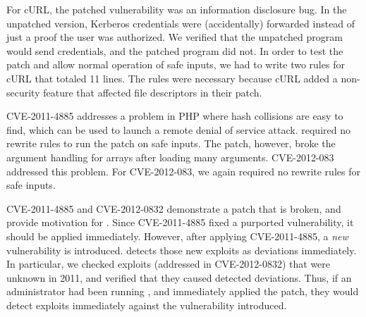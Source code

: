 
For cURL, the patched vulnerability was an information disclosure
bug. In the unpatched version, Kerberos credentials were (accidentally)
forwarded instead of just a proof the user was authorized.  We
verified that the unpatched program would send credentials, and the
patched program did not.  In order to test the patch and allow normal
operation of safe inputs, we had to write two rules for cURL that
totaled 11 lines.  The rules were necessary
because cURL added a non-security feature that affected file
descriptors in their patch.



CVE-2011-4885 addresses a problem in PHP where hash collisions are
easy to find, which can be used to launch a remote denial of service
attack. \tachyon required no rewrite rules
to run the patch on safe inputs.  The patch, however, broke the
argument handling for arrays after loading many
arguments. CVE-2012-083 addressed this problem.  For CVE-2012-083, we
again required no rewrite rules for safe inputs.

CVE-2011-4885 and CVE-2012-0832 demonstrate a patch that is broken,
and provide motivation for \tachyon. Since CVE-2011-4885 fixed a
purported vulnerability, it should be applied immediately. However,
after applying CVE-2011-4885, a \emph{new} vulnerability is
introduced. \tachyon detects those new exploits as deviations
immediately. In particular, we checked exploits (addressed in
CVE-2012-0832) that were unknown in 2011, and verified that they
caused detected deviations. Thus, if an administrator had been running
\tachyon, and immediately applied the patch, they would detect
exploits immediately against the vulnerability introduced.



